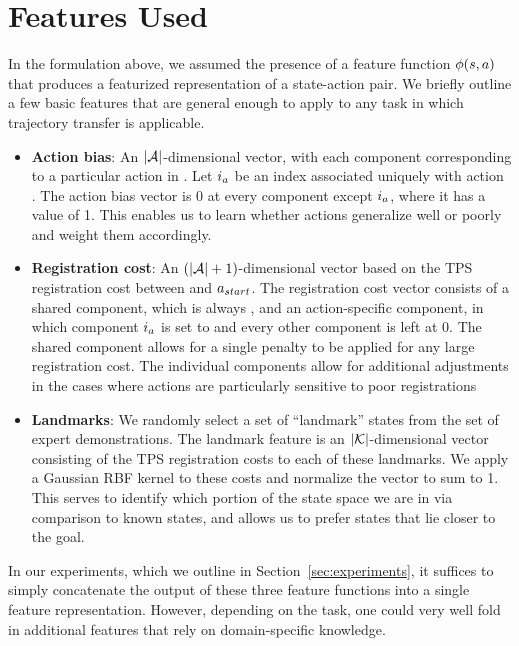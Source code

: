 \section{Features Used}
\label{sec:features}

In the formulation above, we assumed the presence of a feature function
$\phi(s, a)$ that produces a featurized representation of
a state-action pair.  We briefly outline a few basic features that are general
enough to apply to any task in which trajectory transfer is
applicable. 

\begin{itemize}
  \item \textbf{Action bias}: An $|\mathcal{A}{}|$-dimensional vector, with each
    component corresponding to a particular action in \actionset{}. Let
    $i{}_{a{}}$ be an index associated uniquely with action
    \actionvar{}. The action bias vector is 0 at every component except
    $i{}_{a{}}$, where it has a value of 1. This enables us to
    learn whether actions generalize well or poorly and weight them accordingly.
  \item \textbf{Registration cost}: An $(|\mathcal{A}{}|+1)$-dimensional vector
    based on the TPS registration cost \regcost{} between \statevar{} and
    $a{}_{start}$. The registration cost vector consists of a shared
    component, which is always \regcost{}, and an action-specific component, in
    which component $i{}_{a{}}$ is set to \regcost{} and every
    other component is left at 0. The shared component allows for a single
    penalty to be applied for any large registration cost. The individual
    components allow for additional adjustments in the cases where actions are
    particularly sensitive to poor registrations
  \item \textbf{Landmarks}: We randomly select a set of ``landmark'' states
    \landmarkset{} from the set of expert demonstrations. The landmark feature
    is an $|\mathcal{K}{}|$-dimensional vector consisting of the TPS
    registration costs to each of these landmarks. We apply a Gaussian RBF
    kernel to these costs and normalize the vector to sum to 1. This serves to
    identify which portion of the state space we are in via comparison to known
    states, and allows us to prefer states that lie closer to the goal.
\end{itemize}

In our experiments, which we outline in Section~\ref{sec:experiments}, it
suffices to simply concatenate the output of these three feature functions into
a single feature representation. However, depending on the task, one could
very well fold in additional features that rely on domain-specific knowledge.
